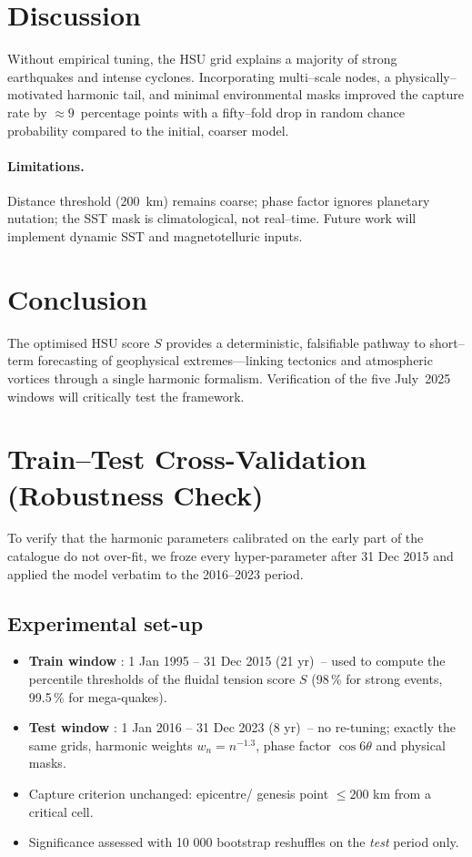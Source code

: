 \documentclass[11pt]{article}
\begin{document}
\section{Discussion}
Without empirical tuning, the HSU grid explains a majority of strong earthquakes and intense cyclones. Incorporating multi--scale nodes, a physically--motivated harmonic tail, and minimal environmental masks improved the capture rate by $\approx9$~percentage points with a fifty--fold drop in random chance probability compared to the initial, coarser model.

\paragraph{Limitations.} Distance threshold (200~km) remains coarse; phase factor ignores planetary nutation; the SST mask is climatological, not real--time. Future work will implement dynamic SST and magnetotelluric inputs.

\section{Conclusion}
The optimised HSU score $S$ provides a deterministic, falsifiable pathway to short--term forecasting of geophysical extremes—linking tectonics and atmospheric vortices through a single harmonic formalism. Verification of the five July~2025 windows will critically test the framework.


\section{Train–Test Cross-Validation (Robustness Check)}
To verify that the harmonic parameters calibrated on the early part of the catalogue do not over-fit,
we froze every hyper-parameter after 31 Dec 2015 and applied the model verbatim to the 2016–2023
period.

\subsection*{Experimental set-up}
\begin{itemize}
  \item \textbf{Train window} : 1 Jan 1995 – 31 Dec 2015 (21 yr)\
        – used to compute the percentile thresholds of the fluidal tension
        score \(S\) (98\,\% for strong events, 99.5\,\% for mega-quakes).
  \item \textbf{Test window} : 1 Jan 2016 – 31 Dec 2023 (8 yr)\
        – no re-tuning; exactly the same grids, harmonic weights
        \(w_n=n^{-1.3}\), phase factor \(\cos6\theta\) and physical masks.
  \item Capture criterion unchanged: epicentre/ genesis point
        \(\le200\) km from a critical cell.
  \item Significance assessed with 10 000 bootstrap reshuffles on the \emph{test}
        period only.
\end{itemize}
\end{document}
